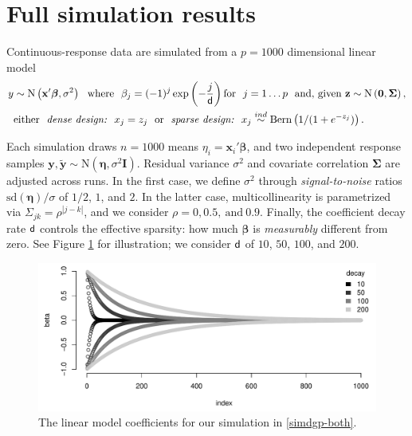 \documentclass[12pt]{article}
\newcommand{\bs}[1]{\boldsymbol{#1}}
\newcommand{\mr}[1]{\mathrm{#1}}
\newcommand{\bm}[1]{\mathbf{#1}}
\begin{document}
\section{Full simulation results}

Continuous-response data are simulated from
 a $p=1000$ dimensional linear model
\begin{align}
\label{simdgp-both}
y &\sim \mr{N}\left(\bm{x}'\bs{\beta},\sigma^2\right) ~~\text{where}~~
\beta_j = (-1)^j\exp\left(-\frac{j}{{\sf d}} \right)\text{for}~~j=1\dots p~~\text{and,~given~}\bm{z} \sim \mr{N}\left(\bm{0},\bs{\Sigma}\right)\notag,\\
&\text{either}~~\textit{dense design:~~} x_j=z_j ~~\text{or}~~ \textit{sparse design:~~} 
x_j \stackrel{ind}{\sim} \mr{Bern}\left( 1/(1+e^{-z_j})\right).
\end{align}

\vspace{-.4cm}
\noindent
Each simulation draws $n=1000$ means $\eta_i =
\bm{x}_i'\bs{\beta}$, and two independent response samples 
$\bm{y},\bm{\tilde y} \sim \mr{N}(\bs{\eta},\sigma^2\bm{I})$. Residual
variance $\sigma^2$ and covariate correlation $\bs{\Sigma}$ are adjusted across
runs.  In the first case, we define $\sigma^2$ through {\it signal-to-noise}
ratios $\mr{sd}(\bs{\eta})/\sigma$ of $1/2$, $1$, and $2$.  In the latter
case, multicollinearity is parametrized via $\Sigma_{jk} =
\rho^{|j-k|}$, and we consider $\rho = 0, 0.5,~\text{and}~0.9$.
Finally, the coefficient decay rate ${\sf d}$ controls the effective sparsity: how much $\bs{\beta}$ is \textit{measurably} different from zero. See Figure \ref{fig:betadecay} for illustration; we consider
${\sf d}$ of $10$, $50$, $100$, and $200$.

\begin{figure}[h]\centering
\includegraphics[width=.8\textwidth]{graphs/betadecay}
\caption{\label{fig:betadecay} The linear model coefficients for our simulation in \ref{simdgp-both}.}
\end{figure}
\end{document}
